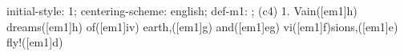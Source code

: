 initial-style: 1;
centering-scheme: english;
def-m1: \grealign;
(c4) 1. Vain([em1]h) dreams([em1]h) of([em1]iv) earth,([em1]g) and([em1]eg) vi([em1]f)sions,([em1]e) fly!([em1]d)